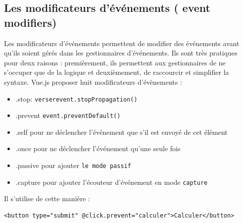 \documentclass{article}
\begin{document}
\subsection{Les modificateurs d'événements ( {\color{monOrange}event modifiers})}
Les modificateurs d'événements permettent de modifier des événements avant qu'ils soient gérés dans les gestionnaires d'événements. Ils sont très pratiques pour deux raisons : premièrement, ils permettent aux gestionnaires de ne s'occuper que de la logique et deuxièmement, de raccourcir et simplifier la syntaxe. {\color{monOrange}Vue.js} proposer huit modificateurs d'évènements :
\begin{itemize}
\item {\color{blue} .stop}: {\tt verserevent.stopPropagation()}
\item {\color{blue} .prevent} {\tt  event.preventDefault()}
\item {\color{blue} .self} pour ne déclencher l'événement que s'il est envoyé de cet élément
\item {\color{blue} .once} pour ne déclencher l'événement qu'une seule fois
\item {\color{blue} .passive} pour ajouter {\tt le mode passif}
\item {\color{blue} .capture} pour ajouter l'écouteur d'événement en mode {\tt capture}
\end{itemize}
Il s'utilise de cette manière :
\begin{verbatim}
<button type="submit" @click.prevent="calculer">Calculer</button>
\end{verbatim}
\end{document}
